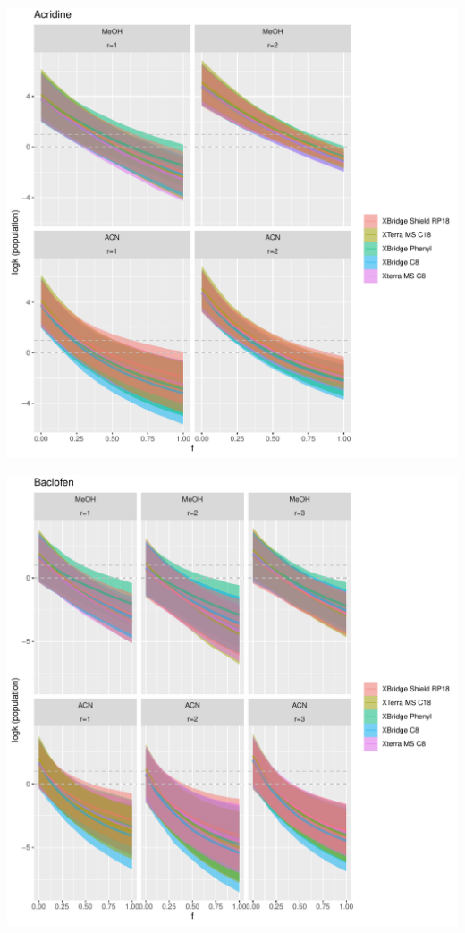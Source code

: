 \documentclass[
]{article}
\begin{document}
\includegraphics{../figures/izoparam/isopred/Acridine.population.pdf}

\newpage{}

\includegraphics{../figures/izoparam/isopred/Baclofen.population.pdf}
\end{document}
